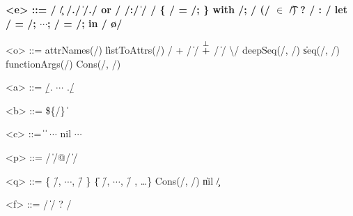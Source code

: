 \begin{grammar}
  \bfseries
  <e> ::=
    \x/ \| \c/
    \alt \e/.\a/ \| \e/.\a/ or \e/
    \alt \p/:\e/ \| \e/ \e/
    \alt \{ \e/ = \e/; \}
    \alt with \e/; \e/
    \alt (\e/ $\bm{\in}$ \t/) ? \e/ : \e/
    \alt let \x/ = \e/; $\cdots{}$; \x/ = \e/; in \e/
    \alt \o/

    <o> ::= attrNames(\e/) \| listToAttrs(\e/)
    \alt \e/ + \e/ \| \e/ $\overset{\bot}{+}$ \e/ \| \e/ \textbackslash \e/
    \alt deepSeq(\e/, \e/) \| seq(\e/, \e/)
    \alt functionArgs(\e/)
    \alt Cons(\e/, \e/)

  <a> ::= \b/. $\cdots{}$ .\b/

  <b> ::= \$\{\e/\} \| 

  <c> ::=  \|  \| $\cdots{}$
    \alt nil
    \alt $\cdots{}$

  <p> ::= \q/ \| \q/@\x/ \| \x/

  <q> ::= \{ \f/, $\cdots{}$, \f/ \} \| \{ \f/, $\cdots{}$, \f/ , \ldots{}\}
    \alt Cons(\x/, \x/) \| nil
    \alt \c/

  <f> ::= \x/ \| \x/ ? \e/

\end{grammar}
